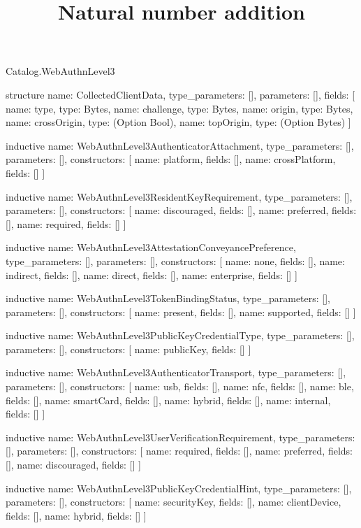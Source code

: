\begin{lexlean}{Catalog.WebAuthnLevel3}
\title{Natural number addition}
\begin{semanticmodule}
structure{
  name: CollectedClientData,
  type_parameters: [],
  parameters: [],
  fields: [
    {name: type, type: Bytes},
    {name: challenge, type: Bytes},
    {name: origin, type: Bytes},
    {name: crossOrigin, type: (Option Bool)},
    {name: topOrigin, type: (Option Bytes)}
  ]
}

inductive{
  name: WebAuthnLevel3AuthenticatorAttachment,
  type_parameters: [],
  parameters: [],
  constructors: [
    {name: platform, fields: []},
    {name: crossPlatform, fields: []}
  ]
}

inductive{
  name: WebAuthnLevel3ResidentKeyRequirement,
  type_parameters: [],
  parameters: [],
  constructors: [
    {name: discouraged, fields: []},
    {name: preferred, fields: []},
    {name: required, fields: []}
  ]
}

inductive{
  name: WebAuthnLevel3AttestationConveyancePreference,
  type_parameters: [],
  parameters: [],
  constructors: [
    {name: none, fields: []},
    {name: indirect, fields: []},
    {name: direct, fields: []},
    {name: enterprise, fields: []}
  ]
}

inductive{
  name: WebAuthnLevel3TokenBindingStatus,
  type_parameters: [],
  parameters: [],
  constructors: [
    {name: present, fields: []},
    {name: supported, fields: []}
  ]
}

inductive{
  name: WebAuthnLevel3PublicKeyCredentialType,
  type_parameters: [],
  parameters: [],
  constructors: [
    {name: publicKey, fields: []}
  ]
}

inductive{
  name: WebAuthnLevel3AuthenticatorTransport,
  type_parameters: [],
  parameters: [],
  constructors: [
    {name: usb, fields: []},
    {name: nfc, fields: []},
    {name: ble, fields: []},
    {name: smartCard, fields: []},
    {name: hybrid, fields: []},
    {name: internal, fields: []}
  ]
}

inductive{
  name: WebAuthnLevel3UserVerificationRequirement,
  type_parameters: [],
  parameters: [],
  constructors: [
    {name: required, fields: []},
    {name: preferred, fields: []},
    {name: discouraged, fields: []}
  ]
}

inductive{
  name: WebAuthnLevel3PublicKeyCredentialHint,
  type_parameters: [],
  parameters: [],
  constructors: [
    {name: securityKey, fields: []},
    {name: clientDevice, fields: []},
    {name: hybrid, fields: []}
  ]
}


\end{semanticmodule}
\end{lexlean}
